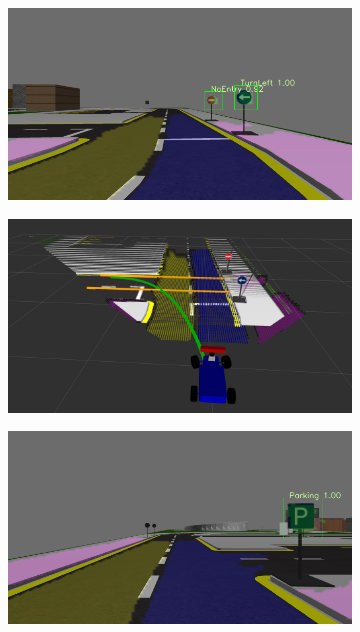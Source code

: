 \begin{figure}[h]
  \centering
  \begin{subfigure}[b]{0.45\linewidth}
      \includegraphics[width=\linewidth]{figures/experiments/turn-left-img.png}
  \end{subfigure}
  \begin{subfigure}[b]{0.45\linewidth}
      \includegraphics[width=\linewidth]{figures/experiments/turn-left-pc.png}
  \end{subfigure}
  \begin{subfigure}[b]{0.45\linewidth}
      \includegraphics[width=\linewidth]{figures/experiments/parking-img.png}

\end{subfigure}
\end{figure}
